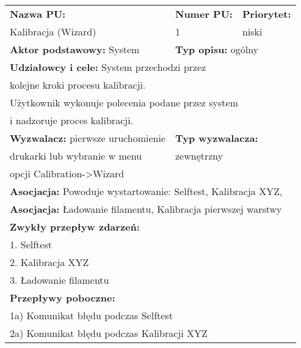 \documentclass{article}
\begin{document}
\begin{enumerate}[label=\arabic*.]
\begin{tabular}{|p{4cm}|p{4cm}|p{4cm}|p{4cm}|p{}|p{4cm}|}
\hline
\multicolumn{4}{|l|}{\textbf{Nazwa PU:}} & \multicolumn{1}{l|}{\textbf{Numer PU:}} & \multicolumn{1}{|l|}{\textbf{Priorytet:} } \\ 
\multicolumn{4}{|l|}{Kalibracja (Wizard)} & \multicolumn{1}{l|}{1} & \multicolumn{1}{|l|}{niski}\\ \hline
\multicolumn{3}{|l|}{\textbf{Aktor podstawowy:} System} & \multicolumn{3}{l|}{\textbf{Typ opisu:} ogólny } \\ \hline
\multicolumn{6}{|l|}{\textbf{Udziałowcy i cele:} System przechodzi przez} \\ 
\multicolumn{6}{|l|}{kolejne kroki procesu kalibracji.} \\
\multicolumn{6}{|l|}{Użytkownik wykonuje polecenia podane przez system} \\
\multicolumn{6}{|l|}{i nadzoruje proces kalibracji.} \\ \hline
\multicolumn{3}{|l|}{\textbf{Wyzwalacz:} pierwsze uruchomienie} & \multicolumn{3}{l|}{\textbf{Typ wyzwalacza:}} \\ 
\multicolumn{3}{|l|}{drukarki lub wybranie w menu} & \multicolumn{3}{l|}{zewnętrzny} \\
\multicolumn{3}{|l|}{ opcji Calibration->Wizard} & \multicolumn{3}{l|}{} \\\hline
\multicolumn{6}{|l|}{\textbf{Asocjacja:} Powoduje wystartowanie: Selftest, Kalibracja XYZ,} \\
\multicolumn{6}{|l|}{\textbf{Asocjacja:} Ładowanie filamentu, Kalibracja pierwszej warstwy} \\
\hline
\multicolumn{6}{|l|}{\textbf{Zwykły przepływ zdarzeń:}} \\
\multicolumn{6}{|l|}{1. Selftest} \\
\multicolumn{6}{|l|}{2. Kalibracja XYZ} \\
\multicolumn{6}{|l|}{3. Ładowanie filamentu} \\
\hline
\multicolumn{6}{|l|}{\textbf{Przepływy poboczne:}} \\
\multicolumn{6}{|l|}{1a) Komunikat błędu podczas Selftest} \\
\multicolumn{6}{|l|}{2a) Komunikat błędu podczas Kalibracji XYZ} \\ \hline
\end{tabular}


\end{enumerate}
\end{document}
